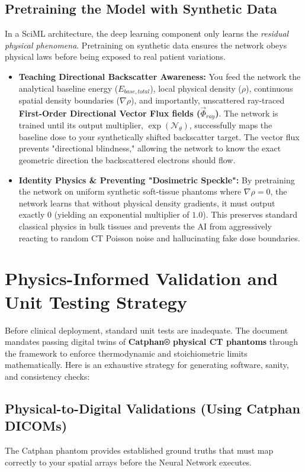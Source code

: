 \documentclass[11pt,a4paper]{article}
\begin{document}
\subsection{Pretraining the Model with Synthetic Data}
In a SciML architecture, the deep learning component only learns the \textit{residual physical phenomena}. Pretraining on synthetic data ensures the network obeys physical laws before being exposed to real patient variations.

\begin{itemize}
    \item \textbf{Teaching Directional Backscatter Awareness:} You feed the network the analytical baseline energy ($E_{base, total}$), local physical density ($\rho$), continuous spatial density boundaries ($\nabla\rho$), and importantly, unscattered ray-traced \textbf{First-Order Directional Vector Flux fields ($\vec{\Phi}_{ray}$)}. The network is trained until its output multiplier, $\exp(\mathcal{N}_{\theta})$, successfully maps the baseline dose to your synthetically shifted backscatter target. The vector flux prevents "directional blindness," allowing the network to know the exact geometric direction the backscattered electrons should flow.
    \item \textbf{Identity Physics \& Preventing "Dosimetric Speckle":} By pretraining the network on uniform synthetic soft-tissue phantoms where $\nabla\rho = 0$, the network learns that without physical density gradients, it must output exactly $0$ (yielding an exponential multiplier of $1.0$). This preserves standard classical physics in bulk tissues and prevents the AI from aggressively reacting to random CT Poisson noise and hallucinating fake dose boundaries.
\end{itemize}

\section{Physics-Informed Validation and Unit Testing Strategy}
Before clinical deployment, standard unit tests are inadequate. The document mandates passing digital twins of \textbf{Catphan® physical CT phantoms} through the framework to enforce thermodynamic and stoichiometric limits mathematically. Here is an exhaustive strategy for generating software, sanity, and consistency checks:

\subsection{Physical-to-Digital Validations (Using Catphan DICOMs)}
The Catphan phantom provides established ground truths that must map correctly to your spatial arrays before the Neural Network executes.
\end{document}
